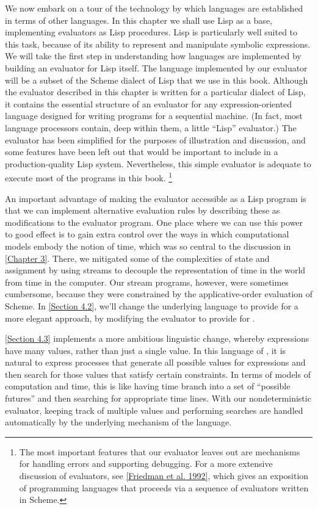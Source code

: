 We now embark on a tour of the technology by which languages are established in terms of other languages.
In this chapter we shall use Lisp as a base, implementing evaluators as Lisp procedures.
Lisp is particularly well suited to this task, because of its ability to represent and manipulate symbolic expressions.
We will take the first step in understanding how languages are implemented by building an evaluator for Lisp itself.
The language implemented by our evaluator will be a subset of the Scheme dialect of Lisp that we use in this book.
Although the evaluator described in this chapter is written for a particular dialect of Lisp, it contains the essential structure of an evaluator for any expression-oriented language designed for writing programs for a sequential machine.
(In fact, most language processors contain, deep within them, a little “Lisp” evaluator.)
The evaluator has been simplified for the purposes of illustration and discussion, and some features have been left out that would be important to include in a production-quality Lisp system.
Nevertheless, this simple evaluator is adequate to execute most of the programs in this book.%
\footnote{
	The most important features that our evaluator leaves out are mechanisms for handling errors and supporting debugging.
	For a more extensive discussion of evaluators, see \cref{Friedman et al. 1992}, which gives an exposition of programming languages that proceeds via a sequence of evaluators written in Scheme.
}

An important advantage of making the evaluator accessible as a Lisp program is that we can implement alternative evaluation rules by describing these as modifications to the evaluator program.
One place where we can use this power to good effect is to gain extra control over the ways in which computational models embody the notion of time, which was so central to the discussion in \cref{Chapter 3}.
There, we mitigated some of the complexities of state and assignment by using streams to decouple the representation of time in the world from time in the computer.
Our stream programs, however, were sometimes cumbersome, because they were constrained by the applicative-order evaluation of Scheme.
In \cref{Section 4.2}, we’ll change the underlying language to provide for a more elegant approach, by modifying the evaluator to provide for .

\cref{Section 4.3} implements a more ambitious linguistic change, whereby expressions have many values, rather than just a single value.
In this language of , it is natural to express processes that generate all possible values for expressions and then search for those values that satisfy certain constraints.
In terms of models of computation and time, this is like having time branch into a set of “possible futures” and then searching for appropriate time lines.
With our nondeterministic evaluator, keeping track of multiple values and performing searches are handled automatically by the underlying mechanism of the language.

